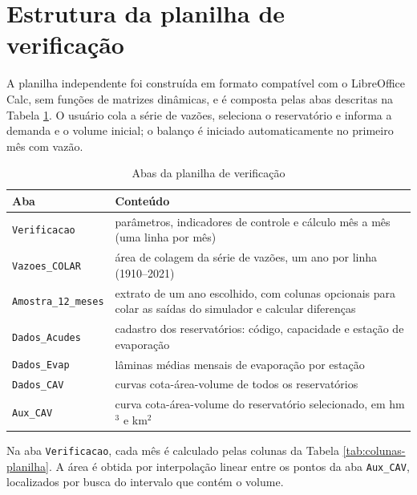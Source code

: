 \label{ap:memoria-calculo}

\section{Estrutura da planilha de verificação}

A planilha independente foi construída em formato compatível com o LibreOffice Calc, sem funções de matrizes dinâmicas, e é composta pelas abas descritas na Tabela \ref{tab:abas-planilha}. O usuário cola a série de vazões, seleciona o reservatório e informa a demanda e o volume inicial; o balanço é iniciado automaticamente no primeiro mês com vazão.

\begin{table}[!htbp]
    \captionsetup{width=15cm}
    \caption{Abas da planilha de verificação}
    \label{tab:abas-planilha}
    \centering
    \footnotesize
    \begin{tabular}{p{3.2cm}p{11.0cm}}
        \toprule
        Aba & Conteúdo \\
        \midrule
        \texttt{Verificacao} & parâmetros, indicadores de controle e cálculo mês a mês (uma linha por mês) \\
        \texttt{Vazoes\_COLAR} & área de colagem da série de vazões, um ano por linha (1910--2021) \\
        \texttt{Amostra\_12\_meses} & extrato de um ano escolhido, com colunas opcionais para colar as saídas do simulador e calcular diferenças \\
        \texttt{Dados\_Acudes} & cadastro dos reservatórios: código, capacidade e estação de evaporação \\
        \texttt{Dados\_Evap} & lâminas médias mensais de evaporação por estação \\
        \texttt{Dados\_CAV} & curvas cota-área-volume de todos os reservatórios \\
        \texttt{Aux\_CAV} & curva cota-área-volume do reservatório selecionado, em hm$^3$ e km$^2$ \\
        \bottomrule
    \end{tabular}
\end{table}

Na aba \texttt{Verificacao}, cada mês é calculado pelas colunas da Tabela \ref{tab:colunas-planilha}. A área é obtida por interpolação linear entre os pontos da aba \texttt{Aux\_CAV}, localizados por busca do intervalo que contém o volume.


